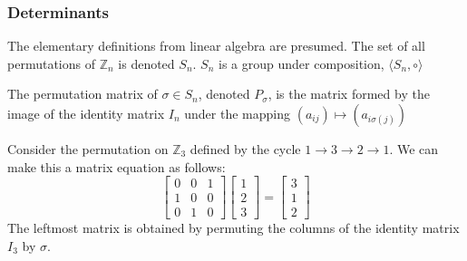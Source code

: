             \subsubsection{Determinants}
                The elementary definitions from linear algebra
                are presumed. The set of all permutations of
                $\mathbb{Z}_{n}$ is denoted $S_n$. $S_{n}$ is a
                group under composition,
                $\langle S_{n},\circ\rangle$
                \begin{definition}
                    The permutation matrix of $\sigma \in S_{n}$,
                    denoted $P_{\sigma}$, is the matrix formed
                    by the image of the identity matrix $I_{n}$
                    under the mapping
                    $(a_{ij})\mapsto (a_{i\sigma(j)})$
                \end{definition}
                \begin{example}
                    Consider the permutation on $\mathbb{Z}_3$
                    defined by the cycle
                    $1\rightarrow 3\rightarrow 2\rightarrow 1$.
                    We can make this a matrix equation as follows:
                    \begin{equation*}
                        \begin{bmatrix}
                            0&0&1\\
                            1&0&0\\
                            0&1&0
                        \end{bmatrix}
                        \begin{bmatrix}
                            1\\
                            2\\
                            3
                        \end{bmatrix}
                        =
                        \begin{bmatrix}
                            3\\
                            1\\
                            2
                        \end{bmatrix}    
                    \end{equation*}
                    The leftmost matrix is obtained by
                    permuting the columns of the identity
                    matrix $I_{3}$ by $\sigma$.
                \end{example}
